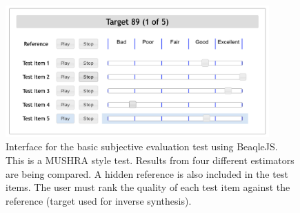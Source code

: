 \begin{figure}
    \centering
    \includegraphics[width=0.9\textwidth]{figures/spiegelib/beaqlejs_interface.png}
    \caption{Interface for the basic subjective evaluation test using BeaqleJS. This is a MUSHRA style test. Results from four different estimators are being compared. A hidden reference is also included in the test items. The user must rank the quality of each test item against the reference (target used for inverse synthesis).}
    \label{fig:basic_subjective}
\end{figure}





